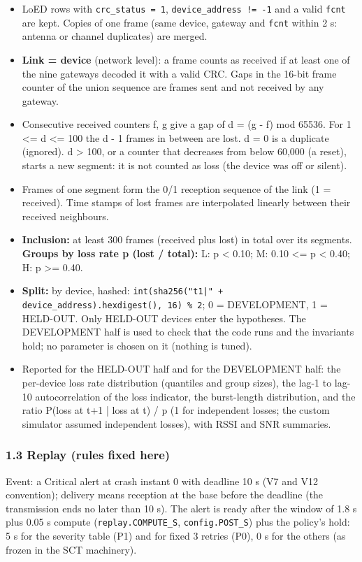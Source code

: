 \begin{itemize}
\item LoED rows with \texttt{crc\_status = 1}, \texttt{device\_address != -1} and a valid \texttt{fcnt} are kept. Copies of one frame (same device, gateway and \texttt{fcnt} within 2 s: antenna or channel duplicates) are merged.
\item \textbf{Link = device} (network level): a frame counts as received if at least one of the nine gateways decoded it with a valid CRC. Gaps in the 16-bit frame counter of the union sequence are frames sent and not received by any gateway.
\item Consecutive received counters f, g give a gap of d = (g - f) mod 65536. For 1 <= d <= 100 the d - 1 frames in between are lost. d = 0 is a duplicate (ignored). d > 100, or a counter that decreases from below 60,000 (a reset), starts a new segment: it is not counted as loss (the device was off or silent).
\item Frames of one segment form the 0/1 reception sequence of the link (1 = received). Time stamps of lost frames are interpolated linearly between their received neighbours.
\item \textbf{Inclusion:} at least 300 frames (received plus lost) in total over its segments. \textbf{Groups by loss rate p (lost / total):} L: p < 0.10; M: 0.10 <= p < 0.40; H: p >= 0.40.
\item \textbf{Split:} by device, hashed: \texttt{int(sha256("t1|" + device\_address).hexdigest(), 16) \% 2}; 0 = DEVELOPMENT, 1 = HELD-OUT. Only HELD-OUT devices enter the hypotheses. The DEVELOPMENT half is used to check that the code runs and the invariants hold; no parameter is chosen on it (nothing is tuned).
\item Reported for the HELD-OUT half and for the DEVELOPMENT half: the per-device loss rate distribution (quantiles and group sizes), the lag-1 to lag-10 autocorrelation of the loss indicator, the burst-length distribution, and the ratio P(loss at t+1 | loss at t) / p (1 for independent losses; the custom simulator assumed independent losses), with RSSI and SNR summaries.
\end{itemize}

\subsubsection*{1.3 Replay (rules fixed here)}

Event: a Critical alert at crash instant 0 with deadline 10 s (V7 and V12 convention); delivery means reception at the base before the deadline (the transmission ends no later than 10 s). The alert is ready after the window of 1.8 s plus 0.05 s compute (\texttt{replay.COMPUTE\_S}, \texttt{config.POST\_S}) plus the policy's hold: 5 s for the severity table (P1) and for fixed 3 retries (P0), 0 s for the others (as frozen in the SCT machinery).

